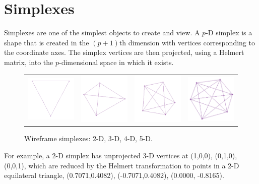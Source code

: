 \section{Simplexes}

Simplexes are one of the simplest objects to create and view. A $p$-D
simplex is a shape that is created in the $(p+1)$th dimension with
vertices corresponding to the coordinate axes. The simplex vertices
are then projected, using a Helmert matrix, into the
$p$-dimensional space in which it exists.

\begin{figure}[ht]
\centering
\begin{tabular}{cccc}
\includegraphics[width=1.2in]{fig/simplex2.pdf} & \includegraphics[width=1.2in]{fig/simplex3.pdf} &
\includegraphics[width=1.2in]{fig/simplex4.pdf} & \includegraphics[width=1.2in]{fig/simplex5.pdf}
\end{tabular}

\caption{Wireframe simplexes: 2-D, 3-D, 4-D, 5-D.}
\end{figure}

For example, a 2-D simplex has unprojected 3-D vertices at (1,0,0), (0,1,0), (0,0,1),
which are reduced by the Helmert transformation to points in a 2-D
equilateral triangle, (0.7071,0.4082), (-0.7071,0.4082), (0.0000,
-0.8165).

